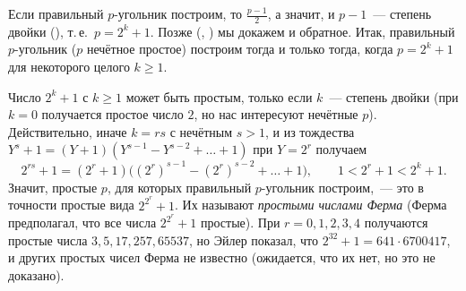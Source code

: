 \begin{center}
\begin{keepfig}
\centering
{}
\end{keepfig}
\end{center}

Если правильный $p$-угольник построим, то $\frac{p-1}2$, а значит, и $p-1$~--- степень двойки (), т.\,е.\ $p=2^k+1$.
Позже (, ) мы докажем и обратное. Итак, правильный $p$-угольник ($p$ нечётное простое) построим тогда и только
тогда, когда $p=2^k+1$ для некоторого целого $k\ge1$.

Число $2^k+1$ с $k\ge1$ может быть простым, только если $k$~--- степень двойки (при $k=0$ получается простое число $2$,
но нас интересуют нечётные $p$). Действительно, иначе $k=rs$ с нечётным $s>1$, и
из тождества $Y^s+1=(Y+1)(Y^{s-1}-Y^{s-2}+\dots+1)$ при $Y=2^r$ получаем
\[
2^{rs}+1=(2^r+1)\bigl((2^r)^{s-1}-(2^r)^{s-2}+\dots+1\bigr),\qquad 1<2^r+1<2^k+1 .
\]
Значит, простые $p$, для которых правильный $p$-угольник построим,~--- это в точности простые вида $2^{2^r}+1$. Их
называют \emph{простыми числами Ферма} (Ферма предполагал, что все числа $2^{2^r}+1$ простые). При $r=0,1,2,3,4$
получаются простые числа $3,5,17,257,65537$, но Эйлер показал, что $2^{32}+1=641\cdot6700417$, и других простых чисел
Ферма не известно (ожидается, что их нет, но это не доказано).

